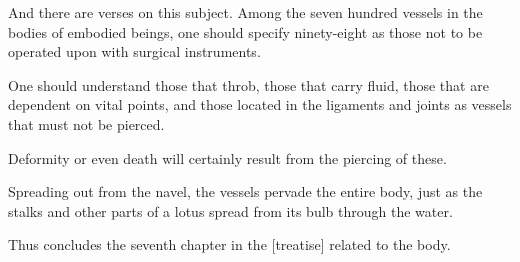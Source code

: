 \begin{translation}
\begin{tt}
\item[22.add1]
And there are verses on this subject.
Among the seven hundred vessels in the bodies of embodied beings, one should specify ninety-eight as those not to be operated upon with surgical instruments.

\item[22.add2]
One should understand those that throb, those that carry fluid, those that are dependent on vital points, and those located in the ligaments and joints as vessels that must not be pierced.

\item[22.add3]
Deformity or even death will certainly result from the piercing of these.

\item[23]
Spreading out from the navel, the vessels pervade the entire body, just as the stalks and other parts of a lotus spread from its bulb through the water.

Thus concludes the seventh chapter in the [treatise] related to the body.

\end{tt}

\end{translation}